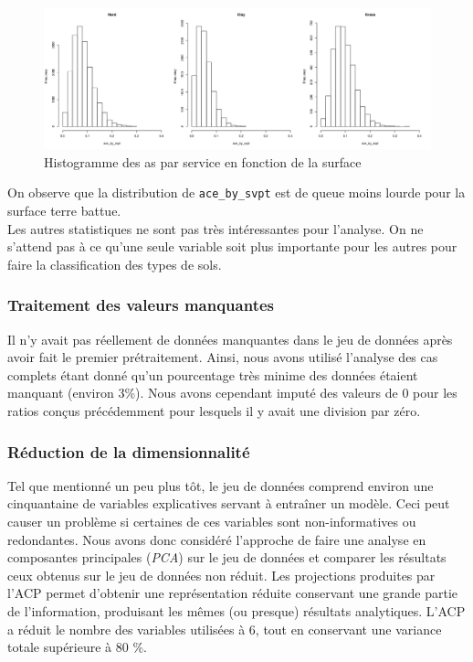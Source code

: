 \begin{figure}[H]
	\caption{Histogramme des as par service en fonction de la surface}
	\label{fig:acebyshist}
	\includegraphics[width=\textwidth]{acebysurfacehist}
\end{figure}

On observe que la distribution de \texttt{ace\_by\_svpt} est de queue moins lourde pour la surface terre battue.\\

Les autres statistiques ne sont pas très intéressantes pour l'analyse. On ne s'attend pas à ce qu'une seule variable soit plus importante pour les autres pour faire la classification des types de sols.

\subsubsection{Traitement des valeurs manquantes}
Il n'y avait pas réellement de données manquantes dans le jeu de données après avoir fait le premier prétraitement. Ainsi, nous avons utilisé l'analyse des cas complets étant donné qu'un pourcentage très minime des données étaient manquant (environ 3\%). Nous avons cependant imputé des valeurs de 0 pour les ratios conçus précédemment pour lesquels il y avait une division par zéro.

\subsubsection{Réduction de la dimensionnalité}
Tel que mentionné un peu plus tôt, le jeu de données comprend environ une cinquantaine de variables explicatives servant à entraîner un modèle. Ceci peut causer un problème si certaines de ces variables sont non-informatives ou redondantes. Nous avons donc considéré l'approche de faire une analyse en composantes principales (\textit{PCA}) sur le jeu de données et comparer les résultats ceux obtenus sur le jeu de données non réduit. Les projections produites par l'ACP permet d'obtenir une représentation réduite conservant une grande partie de l'information, produisant les mêmes (ou presque) résultats analytiques. L'ACP a réduit le nombre des variables utilisées à 6, tout en conservant une variance totale supérieure à 80 \%.

